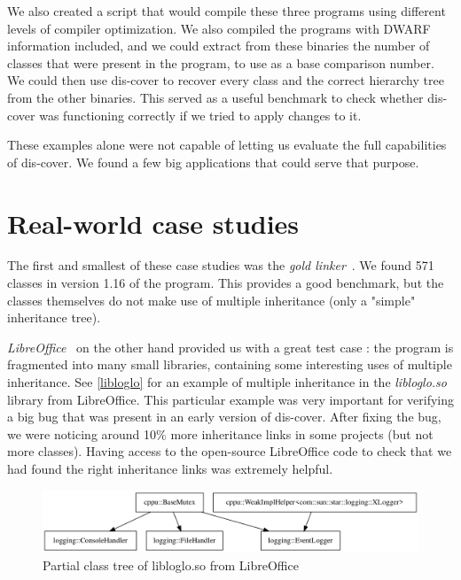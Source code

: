 \documentclass[a4paper,11pt,oneside]{report}
\begin{document}
We also created a script that would compile these three programs using
different levels of compiler optimization.
We also compiled the programs with DWARF information included, and we could
extract from these binaries the number of classes that were present in the
program, to use as a base comparison number.
We could then use dis-cover to recover every class and the correct hierarchy
tree from the other binaries.
This served as a useful benchmark to check whether dis-cover was functioning 
correctly if we tried to apply changes to it.

These examples alone were not capable of letting us evaluate the full 
capabilities of dis-cover.
We found a few big applications that could serve that purpose.


\section{Real-world case studies}

The first and smallest of these case studies was the \emph{gold 
linker}~\cite{gold}.
We found 571 classes in version 1.16 of the program.
This provides a good benchmark, but the classes themselves do not make use of 
multiple inheritance (only a "simple" inheritance tree).

\emph{LibreOffice}~\cite{libreoffice} on the other hand provided us with a 
great test case :
the program is fragmented into many small libraries, containing some 
interesting uses of multiple inheritance.
See \autoref{libloglo} for an example of multiple inheritance in the 
\emph{libloglo.so} library from LibreOffice.
This particular example was very important for verifying a big bug that was 
present in an early version of dis-cover.
After fixing the bug, we were noticing around 10\% more inheritance links in 
some projects (but not more classes).
Having access to the open-source LibreOffice code to check that we had found 
the right inheritance links was extremely helpful.

\begin{figure}

\includegraphics[width=16cm]{libloglo_partial.png}
\caption{Partial class tree of libloglo.so from LibreOffice}
\label{libloglo}

\end{figure}
\end{document}
